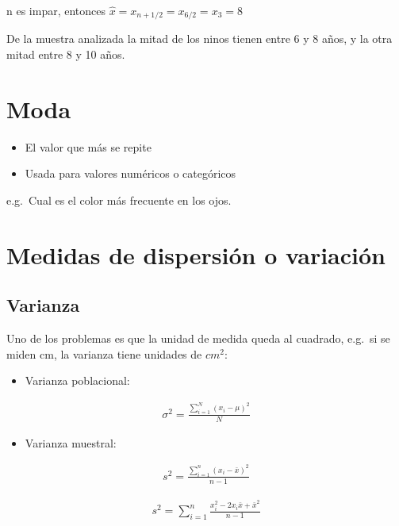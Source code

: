 \documentclass[twocolumn]{article}
\providecommand{\tightlist}{%
  \setlength{\itemsep}{0pt}\setlength{\parskip}{0pt}}
\begin{document}
n es impar, entonces \(\hat{x} = x_{n+1/2}=x_{6/2} = x_3 = 8\)

De la muestra analizada la mitad de los ninos tienen entre 6 y 8 años, y
la otra mitad entre 8 y 10 años.

\section{Moda}\label{moda}

\begin{itemize}
\tightlist
\item
  El valor que más se repite
\item
  Usada para valores numéricos o categóricos
\end{itemize}

e.g.~Cual es el color más frecuente en los ojos.

\section{Medidas de dispersión o
variación}\label{medidas-de-dispersiuxf3n-o-variaciuxf3n}

\subsection{Varianza}\label{varianza}

Uno de los problemas es que la unidad de medida queda al cuadrado,
e.g.~si se miden cm, la varianza tiene unidades de \(cm^2\):

\begin{itemize}
\tightlist
\item
  Varianza poblacional:
\end{itemize}

\begin{align}
\sigma^2= \frac{\sum_{i=1}^N (x_i - \mu)^2}{N}
\end{align}

\begin{itemize}
\tightlist
\item
  Varianza muestral:
\end{itemize}

\begin{align}
s^2= \frac{\sum_{i=1}^n (x_i - \bar{x})^2}{n-1}
\end{align}

\begin{align}
s^2 = \sum_{i=1}^n \frac{x_i^2 - 2x_i\bar{x}+ \bar{x}^2}{n-1}
\end{align}
\end{document}
